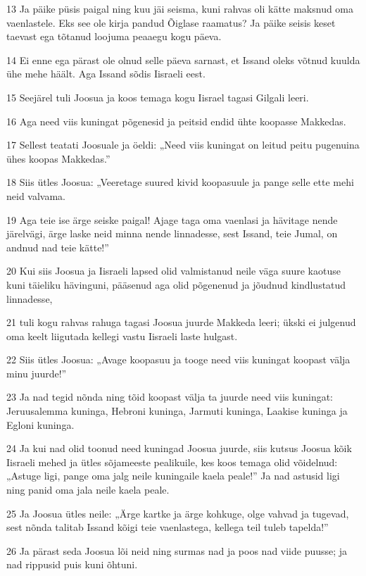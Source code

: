 \par 13 Ja päike püsis paigal ning kuu jäi seisma, kuni rahvas oli kätte maksnud oma vaenlastele. Eks see ole kirja pandud Õiglase raamatus? Ja päike seisis keset taevast ega tõtanud loojuma peaaegu kogu päeva.
\par 14 Ei enne ega pärast ole olnud selle päeva sarnast, et Issand oleks võtnud kuulda ühe mehe häält. Aga Issand sõdis Iisraeli eest.
\par 15 Seejärel tuli Joosua ja koos temaga kogu Iisrael tagasi Gilgali leeri.
\par 16 Aga need viis kuningat põgenesid ja peitsid endid ühte koopasse Makkedas.
\par 17 Sellest teatati Joosuale ja öeldi: „Need viis kuningat on leitud peitu pugenuina ühes koopas Makkedas.”
\par 18 Siis ütles Joosua: „Veeretage suured kivid koopasuule ja pange selle ette mehi neid valvama.
\par 19 Aga teie ise ärge seiske paigal! Ajage taga oma vaenlasi ja hävitage nende järelvägi, ärge laske neid minna nende linnadesse, sest Issand, teie Jumal, on andnud nad teie kätte!”
\par 20 Kui siis Joosua ja Iisraeli lapsed olid valmistanud neile väga suure kaotuse kuni täieliku hävinguni, pääsenud aga olid põgenenud ja jõudnud kindlustatud linnadesse,
\par 21 tuli kogu rahvas rahuga tagasi Joosua juurde Makkeda leeri; ükski ei julgenud oma keelt liigutada kellegi vastu Iisraeli laste hulgast.
\par 22 Siis ütles Joosua: „Avage koopasuu ja tooge need viis kuningat koopast välja minu juurde!”
\par 23 Ja nad tegid nõnda ning tõid koopast välja ta juurde need viis kuningat: Jeruusalemma kuninga, Hebroni kuninga, Jarmuti kuninga, Laakise kuninga ja Egloni kuninga.
\par 24 Ja kui nad olid toonud need kuningad Joosua juurde, siis kutsus Joosua kõik Iisraeli mehed ja ütles sõjameeste pealikuile, kes koos temaga olid võidelnud: „Astuge ligi, pange oma jalg neile kuningaile kaela peale!” Ja nad astusid ligi ning panid oma jala neile kaela peale.
\par 25 Ja Joosua ütles neile: „Ärge kartke ja ärge kohkuge, olge vahvad ja tugevad, sest nõnda talitab Issand kõigi teie vaenlastega, kellega teil tuleb tapelda!”
\par 26 Ja pärast seda Joosua lõi neid ning surmas nad ja poos nad viide puusse; ja nad rippusid puis kuni õhtuni.
